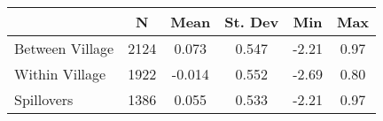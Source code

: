 \begin{tabular}{l*{5}{c}}\hline&\multicolumn{1}{c}{N}&\multicolumn{1}{c}{Mean}&\multicolumn{1}{c}{St. Dev}&\multicolumn{1}{c}{Min}&\multicolumn{1}{c}{Max}\\ \hline 
Between Village & 2124 & 0.073 & 0.547 & -2.21 & 0.97 \\
Within Village & 1922 & -0.014 & 0.552 & -2.69 & 0.80 \\
Spillovers & 1386 & 0.055 & 0.533 & -2.21 & 0.97 \\
\hline \end{tabular}

